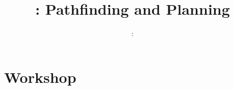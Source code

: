\usepackage{../../beamerthemeFalmouthGamesAcademy}
\usepackage{multimedia}
\graphicspath{ {../../}{../07/} }


\usepackage[normalem]{ulem}
\usepackage{wasysym}

\usepackage{pdfpages}

\usepackage{algpseudocode}

\usetikzlibrary{arrows,automata}




\title{\sessionnumber: Pathfinding and Planning}
\subtitle{\modulecode: \moduletitle}

\frame{\titlepage} 




%

\part{Workshop}
\frame{\partpage}


